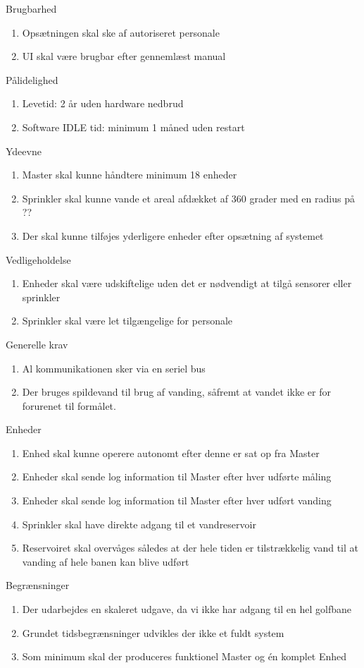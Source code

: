\large {Brugbarhed}
\begin{enumerate}
\item Opsætningen skal ske af autoriseret personale
\item UI skal være brugbar efter gennemlæst manual
\end{enumerate}

\large{Pålidelighed}
\begin{enumerate}
\item Levetid: 2 år uden hardware nedbrud
\item Software IDLE tid: minimum 1 måned uden restart
\end{enumerate}

\large{Ydeevne}
\begin{enumerate}
\item Master skal kunne håndtere minimum 18 enheder
\item Sprinkler skal kunne vande et areal afdækket af 360 grader med en radius på ??
\item Der skal kunne tilføjes yderligere enheder efter opsætning af systemet
\end{enumerate}

\large{Vedligeholdelse}
\begin{enumerate}
\item Enheder skal være udskiftelige uden det er nødvendigt at tilgå sensorer eller sprinkler
\item Sprinkler skal være let tilgængelige for personale
\end{enumerate}

\large{Generelle krav}
\begin{enumerate}
\item Al kommunikationen sker via en seriel bus 
\item Der bruges spildevand til brug af vanding, såfremt at vandet ikke er for forurenet til formålet. 
\end{enumerate}

\large{Enheder}
\begin{enumerate}
\item Enhed skal kunne operere autonomt efter denne er sat op fra Master
\item Enheder skal sende log information til Master efter hver udførte måling
\item Enheder skal sende log information til Master efter hver udført vanding
\item Sprinkler skal have direkte adgang til et vandreservoir 
\item Reservoiret skal overvåges således at der hele tiden er tilstrækkelig vand til at vanding af hele banen kan blive udført
\end{enumerate}

\large{Begrænsninger}
\begin{enumerate}
\item Der udarbejdes en skaleret udgave, da vi ikke har adgang til en hel golfbane
\item Grundet tidsbegrænsninger udvikles der ikke et fuldt system 
\item Som minimum skal der produceres funktionel Master og én komplet Enhed
\end{enumerate}

